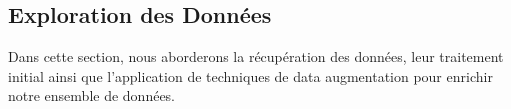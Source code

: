 \subsection{Exploration des Données}



Dans cette section, nous aborderons la récupération des données, leur traitement initial ainsi que l'application de techniques de data augmentation pour enrichir notre ensemble de données.